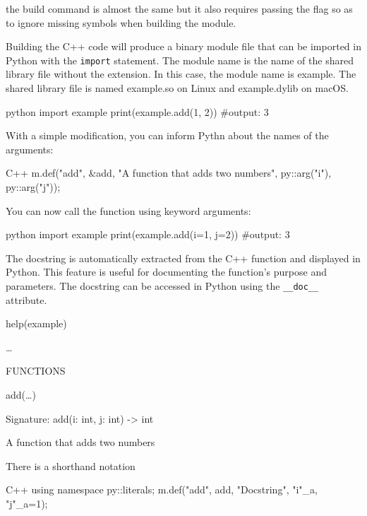 \begin{warningblock}[On macOS]
    the build command is almost the same but it also requires passing the  flag so as to ignore missing symbols when building the module.
\end{warningblock}

Building the C++ code will produce a binary module file that can be imported in Python with the \texttt{import} statement. The module name is the name of the shared library file without the extension. In this case, the module name is example. The shared library file is named example.so on Linux and example.dylib on macOS.

\begin{neonlisting}{python}
import example
print(example.add(1, 2)) #output: 3
\end{neonlisting}

With a simple modification, you can inform Pythn about the names of the arguments:

\begin{neonlisting}[language=C++]{C++}
m.def("add", &add, "A function that adds two numbers", 
py::arg("i"), py::arg("j"));
\end{neonlisting}

You can now call the function using keyword arguments:

\begin{neonlisting}{python}
import example
print(example.add(i=1, j=2)) #output: 3
\end{neonlisting}

\begin{observationblock}[Documentation]
    The docstring is automatically extracted from the C++ function and displayed in Python. This
    feature is useful for documenting the function's purpose and parameters. The docstring can be
    accessed in Python using the \texttt{\_\_doc\_\_} attribute.

    help(example) 

    \dots 

    FUNCTIONS

        add(\dots)

            Signature: add(i: int, j: int) -> int


            A function that adds two numbers
\end{observationblock}

There is a shorthand notation 

\begin{neonlisting}[language=C++]{C++}
using namespace py::literals;
m.def("add", add, "Docstring", "i"_a, "j"_a=1);
\end{neonlisting}

